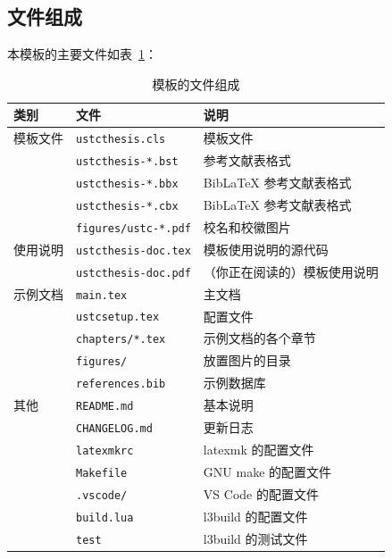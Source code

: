 \documentclass[a4paper]{ltxdoc}
\DeclareRobustCommand\file{\nolinkurl}
\begin{document}
\subsection{文件组成}
本模板的主要文件如表~\ref{tab:files}：
\begin{table}
  \centering\small
  \caption{模板的文件组成}
  \label{tab:files}
  \begin{tabular}{lll}
    \toprule
    类别     & 文件                      & 说明                         \\
    \midrule
    模板文件 & \file{ustcthesis.cls}     & 模板文件                     \\
             & \file{ustcthesis-*.bst}   & \BibTeX{} 参考文献表格式     \\
             & \file{ustcthesis-*.bbx}   & BibLaTeX 参考文献表格式      \\
             & \file{ustcthesis-*.cbx}   & BibLaTeX 参考文献表格式      \\
             & \file{figures/ustc-*.pdf} & 校名和校徽图片               \\
    \midrule
    使用说明 & \file{ustcthesis-doc.tex} & 模板使用说明的源代码         \\
             & \file{ustcthesis-doc.pdf} & （你正在阅读的）模板使用说明 \\
    \midrule
    示例文档 & \file{main.tex}           & 主文档                       \\
             & \file{ustcsetup.tex}      & 配置文件                     \\
             & \file{chapters/*.tex}     & 示例文档的各个章节           \\
             & \file{figures/}           & 放置图片的目录               \\
             & \file{references.bib}     & \BibTeX{} 示例数据库         \\
    \midrule
    其他     & \file{README.md}          & 基本说明                     \\
             & \file{CHANGELOG.md}       & 更新日志                     \\
             & \file{latexmkrc}          & latexmk 的配置文件           \\
             & \file{Makefile}           & GNU make 的配置文件          \\
             & \file{.vscode/}           & VS Code 的配置文件           \\
             & \file{build.lua}          & l3build 的配置文件           \\
             & \file{test}               & l3build 的测试文件           \\
    \bottomrule
  \end{tabular}
\end{table}
\end{document}
